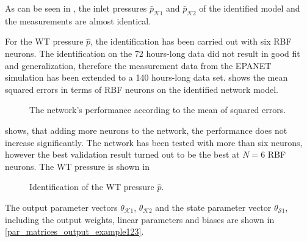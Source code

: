  As can be seen in , the inlet pressures $\bar{p}_{\mathcal{K}1}$ and $\bar{p}_{\mathcal{K}2}$ of the identified model and the measurements are almost identical. 

For the WT pressure $\hat{p}$, the identification has been carried out with six RBF neurons. The identification on the 72 hours-long data did not result in good fit and generalization, therefore the measurement data from the EPANET simulation has been extended to a 140 hours-long data set.  shows the mean squared errors in terms of RBF neurons on the identified network model.

\vspace{-1mm}

 \begin{figure}[H]
 \centering
  
 \vspace{-3.5mm}
 \caption{The network’s performance according to the mean of squared errors.}
 \label{fig:MSE_state}
 \end{figure}

 \vspace{-3mm}

  shows, that adding more neurons to the network, the performance does not increase significantly. The network has been tested with more than six neurons, however the best validation result turned out to be the best at $N = 6$ RBF neurons. The WT pressure is shown in 



 \begin{figure}[H]
 \centering
  
 \vspace{-2.5mm}
 \caption{Identification of the WT pressure $\hat{p}$.}
 \label{fig:WT_ident_sigma1}
 \end{figure}

 \vspace{-4mm}

The output parameter vectors $\theta_{\mathcal{K}1}$, $\theta_{\mathcal{K}2}$ and the state parameter vector $\theta_{\mathcal{S}1}$, including the output weights, linear parameters and biases are shown in \eqref{par_matrices_output_example123}.

